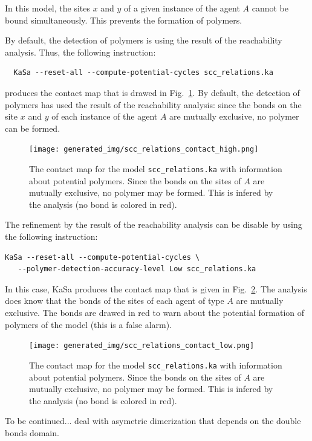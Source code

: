 \documentclass[11pt]{book}
\def\KaSa{\textsf{KaSa}}
\begin{document}
In this model, the sites $x$ and $y$ of a given instance of the agent $A$ cannot be bound simultaneously. This prevents the formation of polymers.

By default, the detection of polymers is using the result of the reachability analysis. Thus, the following instruction:
\begin{verbatim}
  KaSa --reset-all --compute-potential-cycles scc_relations.ka
\end{verbatim}
produces the contact map that is drawed in Fig.~\ref{fig:scc-relations-high}.
By default, the detection of polymers has used the result of the reachability analysis: since the bonds on the site $x$ and $y$ of each instance of the agent $A$ are mutually exclusive, no polymer can be formed.


\begin{figure}[h]
\centering
\texttt{[image: generated\_img/scc\_relations\_contact\_high.png]}
\caption{The contact map for the model \texttt{scc\_relations.ka} with information about potential polymers. Since the bonds on the sites of $A$ are mutually exclusive, no polymer may be formed. This is infered by the analysis (no bond is colored in red).}
\label{fig:scc-relations-high}
\end{figure}

The refinement by the result of the reachability analysis can be disable by using the following instruction:
\begin{verbatim}
KaSa --reset-all --compute-potential-cycles \
   --polymer-detection-accuracy-level Low scc_relations.ka
\end{verbatim}
In this case, {\KaSa} produces the contact map that is given in Fig.~\ref{fig:scc-relations-low}. The analysis does know that the bonds of the sites of each agent of type $A$ are mutually exclusive. The bonds are drawed in red to warn about the potential formation of polymers of the model (this is a false alarm).


\begin{figure}[htbp]
\centering
\texttt{[image: generated\_img/scc\_relations\_contact\_low.png]}
\caption{The contact map for the model \texttt{scc\_relations.ka} with information about potential polymers. Since the bonds on the sites of $A$ are mutually exclusive, no polymer may be formed. This is infered by the analysis (no bond is colored in red).}
\label{fig:scc-relations-low}
\end{figure}


To be continued... deal with asymetric dimerization that depends on the double bonds domain.
\end{document}
